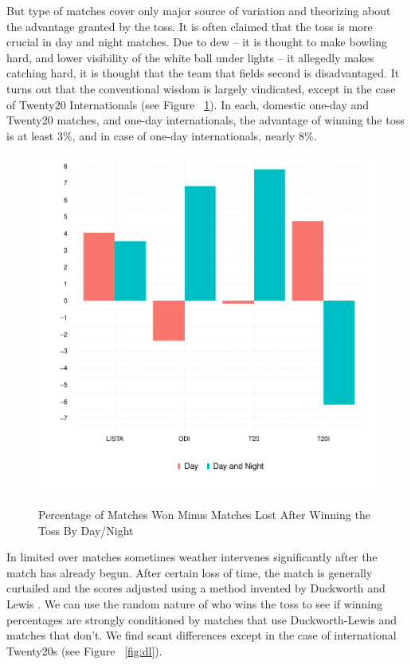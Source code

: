\documentclass[12pt]{article}
\begin{document}
But type of matches cover only major source of variation and theorizing about the advantage granted by the toss. It is often claimed that the toss is more crucial in day and night matches. Due to dew -- it is thought to make bowling hard, and lower visibility of the white ball under lights -- it allegedly makes catching hard, it is thought that the team that fields second is disadvantaged. It turns out that the conventional wisdom is largely vindicated, except in the case of Twenty20 Internationals (see Figure ~\ref{fig:dn}). In each, domestic one-day and Twenty20 matches, and one-day internationals, the advantage of winning the toss is at least 3\%, and in case of one-day internationals, nearly 8\%.

\begin{figure}[htbp]
\centering
\caption{Percentage of Matches Won Minus Matches Lost After Winning the Toss By Day/Night}
\includegraphics[scale=.85]{../figs/winbyDayNight.pdf}
\label{fig:dn}
\end{figure}

In limited over matches sometimes weather intervenes significantly after the match has already begun. After certain loss of time, the match is generally curtailed and the scores adjusted using a method invented by Duckworth and Lewis \citep[see][]{duckworth1998}. We can use the random nature of who wins the toss to see if winning percentages are strongly conditioned by matches that use Duckworth-Lewis and matches that don't. We find scant differences except in the case of international Twenty20s (see Figure ~\ref{fig:dl}).
\end{document}
